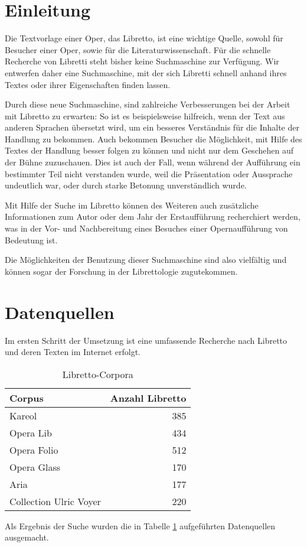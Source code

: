 \section{Einleitung}
Die Textvorlage einer Oper, das Libretto,
ist eine wichtige Quelle, sowohl für Besucher einer Oper,
sowie für die Literaturwissenschaft.
Für die schnelle Recherche von Libretti steht bisher
keine Suchmaschine zur Verfügung.
Wir entwerfen daher eine Suchmaschine, mit der sich Libretti schnell
anhand ihres Textes oder ihrer Eigenschaften finden lassen.

Durch diese neue Suchmaschine, sind zahlreiche Verbesserungen
bei der Arbeit mit Libretto zu erwarten: 
So ist es beispielsweise hilfreich, 
wenn der Text aus anderen Sprachen übersetzt wird, 
um ein besseres Verständnis für die Inhalte der Handlung zu bekommen.
Auch bekommen Besucher die Möglichkeit, 
mit Hilfe des Textes der Handlung besser folgen zu können
und nicht nur dem Geschehen auf der Bühne zuzuschauen.
Dies ist auch der Fall, 
wenn während der Aufführung ein bestimmter Teil nicht verstanden wurde,
weil die Präsentation oder Aussprache undeutlich war,
oder durch starke Betonung unverständlich wurde. 

Mit Hilfe der Suche im Libretto können des Weiteren
auch zusätzliche Informationen zum Autor
oder dem Jahr der Erstaufführung recherchiert werden,
was in der Vor- und Nachbereitung eines Besuches
einer Opernaufführung von Bedeutung ist. 

Die Möglichkeiten der Benutzung dieser Suchmaschine sind also vielfältig
und können sogar der Forschung in der Librettologie zugutekommen.

\section{Datenquellen}
\label{sec:corpora}
Im ersten Schritt der Umsetzung ist eine umfassende Recherche
nach Libretto und deren Texten im Internet erfolgt.
\begin{table}
    \centering
    \begin{tabular}{l r}
        \toprule
        Corpus & Anzahl Libretto \\
        \midrule
        Kareol & 385 \\
        Opera Lib & 434 \\
        Opera Folio & 512 \\
        Opera Glass & 170 \\
        Aria & 177 \\
        Collection Ulric Voyer & 220 \\
        \bottomrule
    \end{tabular}
    \caption{Libretto-Corpora}
    \label{tab:corpora}
\end{table}
Als Ergebnis der Suche wurden die in Tabelle \ref{tab:corpora} aufgeführten
Datenquellen ausgemacht.

